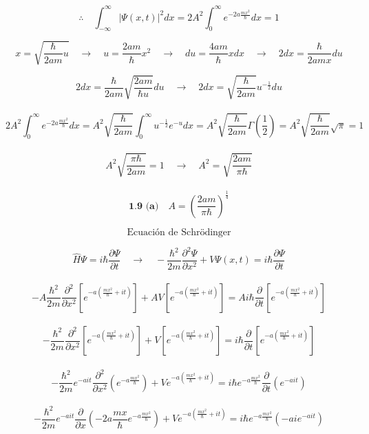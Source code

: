 \documentclass[10pt,a4papper]{article}
\begin{document}
\[\therefore\quad\int_{-\infty}^\infty|\Psi(x,t)|^2dx=2A^2\int_0^\infty e^{-2a\frac{mx^2}{\hbar}}dx=1\]

\[x=\sqrt{\frac{\hbar}{2am}u}\quad\to\quad u=\frac{2am}{\hbar}x^2\quad\to\quad du=\frac{4am}{\hbar}xdx\quad\to\quad 2dx=\frac{\hbar}{2amx}du\]

\[2dx=\frac{\hbar}{2am}\sqrt{\frac{2am}{\hbar u}}du\quad\to\quad 2dx=\sqrt{\frac{\hbar}{2am}}u^{-\frac{1}{2}}du\]\\

\[2A^2\int_0^\infty e^{-2a\frac{mx^2}{\hbar}}dx=
A^2\sqrt{\frac{\hbar}{2am}}\int_0^\infty u^{-\frac{1}{2}}e^{-u}dx=
A^2\sqrt{\frac{\hbar}{2am}}\Gamma\left(\frac{1}{2}\right)=
A^2\sqrt{\frac{\hbar}{2am}}\sqrt{\pi}=1\]\\

\[A^2\sqrt{\frac{\pi\hbar}{2am}}=1\quad\to\quad A^2=\sqrt{\frac{2am}{\pi\hbar}}\]\\

\[\boxed{\textbf{1.9 (a)}\quad A=\left(\frac{2am}{\pi\hbar}\right)^\frac{1}{4}}\]

\newpage
\[\text{Ecuación de Schrödinger}\]

\[\hat H\Psi=i\hbar\frac{\partial\Psi}{\partial t}\quad\to\quad
-\frac{\hbar^2}{2m}\frac{\partial^2\Psi}{\partial x^2}+V\Psi(x,t)=i\hbar\frac{\partial\Psi}{\partial t}\]\\

\[-A\frac{\hbar^2}{2m}\frac{\partial^2}{\partial x^2}\left[e^{-a\left(\frac{mx^2}{\hbar}+it\right)}\right]
+AV\left[e^{-a\left(\frac{mx^2}{\hbar}+it\right)}\right]=
Ai\hbar\frac{\partial}{\partial t}\left[e^{-a\left(\frac{mx^2}{\hbar}+it\right)}\right]\]\\

\[-\frac{\hbar^2}{2m}\frac{\partial^2}{\partial x^2}\left[e^{-a\left(\frac{mx^2}{\hbar}+it\right)}\right]
+V\left[e^{-a\left(\frac{mx^2}{\hbar}+it\right)}\right]=
i\hbar\frac{\partial}{\partial t}\left[e^{-a\left(\frac{mx^2}{\hbar}+it\right)}\right]\]\\

\[-\frac{\hbar^2}{2m}e^{-ait}\frac{\partial^2}{\partial x^2}\left(e^{-a\frac{mx^2}{\hbar}}\right)
+Ve^{-a\left(\frac{mx^2}{\hbar}+it\right)}=
i\hbar e^{-a\frac{mx^2}{\hbar}}\frac{\partial}{\partial t}\left(e^{-ait}\right)\]\\

\[-\frac{\hbar^2}{2m}e^{-ait}\frac{\partial}{\partial x}\left(-2a\frac{mx}{\hbar}e^{-a\frac{mx^2}{\hbar}}\right)
+Ve^{-a\left(\frac{mx^2}{\hbar}+it\right)}=
i\hbar e^{-a\frac{mx^2}{\hbar}}\left(-aie^{-ait}\right)\]\\
\end{document}
